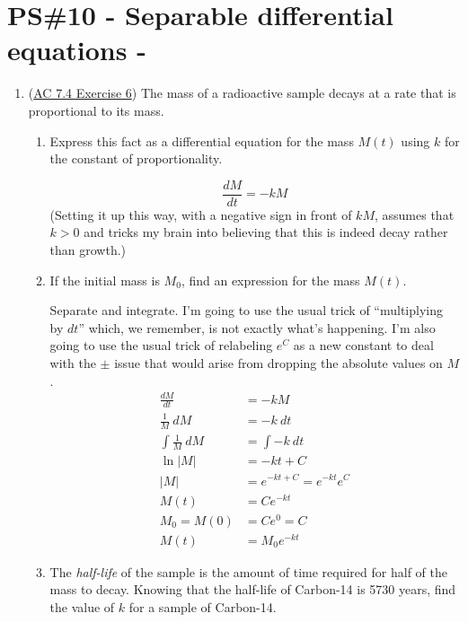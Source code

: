 


%


\allowdisplaybreaks
\section{PS\#10 - Separable differential equations -  }

\everymath{\displaystyle}
\begin{enumerate}[leftmargin=0pt]

\item (\href{https://activecalculus.org/single/sec-7-4-separable.html#tjm}{AC 7.4 Exercise 6}) The mass of a radioactive sample decays at a rate that is proportional to its mass.
\begin{enumerate}
    \item Express this fact as a differential equation for the mass $M(t)$ using $k$ for the constant of proportionality.
    
    \begin{red}
    \[\frac{dM}{dt} = -kM\]
    (Setting it up this way, with a negative sign in front of $kM$, assumes that $k>0$ and tricks my brain into believing that this is indeed decay rather than growth.)
    \end{red}
    \item If the initial mass is $M_0$, find an expression for the mass $M(t)$.
    
    \begin{red}
    Separate and integrate. I'm going to use the usual trick of ``multiplying by $dt$'' which, we remember, is not exactly what's happening. I'm also going to use the usual trick of relabeling $e^C$ as a new constant to deal with the $\pm$ issue that would arise from dropping the absolute values on $M$.
    \begin{align*}
        \frac{dM}{dt} &= -kM \\
        \frac{1}{M}\ dM &= -k\ dt \\
        \int \frac{1}{M}\ dM &= \int -k\ dt \\
        \ln|M| &= -kt + C \\
        |M| &= e^{-kt+C} = e^{-kt} e^C \\
        M(t) &= Ce^{-kt} \\
        M_0 = M(0) &= Ce^0 = C \\
        M(t) &= M_0 e^{-kt}
    \end{align*}
    \end{red}
    \item The \textit{half-life} of the sample is the amount of time required for half of the mass to decay. Knowing that the half-life of Carbon-14 is 5730 years, find the value of $k$ for a sample of Carbon-14.
    

\end{enumerate}
\end{enumerate}
